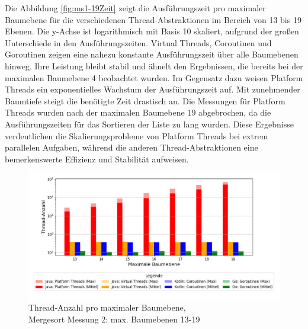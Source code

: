 \documentclass[fontsize=12pt,paper=a4,twoside=semi,parskip=half-,headsepline,headinclude]{scrreprt}
\begin{document}
Die Abbildung \ref{fig:ms1-19Zeit} zeigt die Ausführungszeit pro maximaler Baumebene für die verschiedenen Thread-Abstraktionen im Bereich von 13 bis 19 Ebenen. Die y-Achse ist logarithmisch mit Basis 10 skaliert, aufgrund der großen Unterschiede in den Ausführungszeiten. Virtual Threads, Coroutinen und Goroutinen zeigen eine nahezu konstante Ausführungszeit über alle Baumebenen hinweg. Ihre Leistung bleibt stabil und ähnelt den Ergebnissen, die bereits bei der maximalen Baumebene 4 beobachtet wurden. Im Gegensatz dazu weisen Platform Threads ein exponentielles Wachstum der Ausführungszeit auf. Mit zunehmender Baumtiefe steigt die benötigte Zeit drastisch an. Die Messungen für Platform Threads wurden nach der maximalen Baumebene 19 abgebrochen, da die Ausführungszeiten für das Sortieren der Liste zu lang wurden. Diese Ergebnisse verdeutlichen die Skalierungsprobleme von Platform Threads bei extrem parallelen Aufgaben, während die anderen Thread-Abstraktionen eine bemerkenswerte Effizienz und Stabilität aufweisen.

\begin{figure}[H]
	\centering
	\includegraphics[scale=0.5]{figures/mergesort/Maximalebauebenen1-19_pvcg/num_threads_bar_plot.png}
	\caption{Thread-Anzahl pro maximaler Baumebene,\\ Mergesort Messung 2: max. Baumebenen 13-19}
	\label{fig:ms1-19Threads}
\end{figure}
\end{document}
